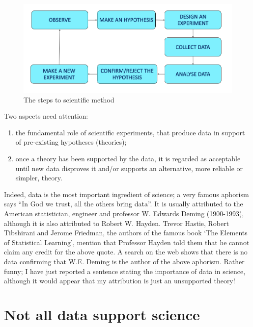 \documentclass[a4paper,12pt,oneside]{book}
\providecommand{\tightlist}{%
  \setlength{\itemsep}{0pt}\setlength{\parskip}{0pt}}
\begin{document}
\begin{figure}

{\centering \includegraphics[width=0.75\linewidth]{_images/MSAMap} 

}

\caption{The steps to scientific method}\label{fig:figName11}
\end{figure}

Two aspects need attention:

\begin{enumerate}
\def\labelenumi{\arabic{enumi}.}
\tightlist
\item
  the fundamental role of scientific experiments, that produce data in support of pre-existing hypotheses (theories);
\item
  once a theory has been supported by the data, it is regarded as acceptable until new data disproves it and/or supports an alternative, more reliable or simpler, theory.
\end{enumerate}

Indeed, data is the most important ingredient of science; a very famous aphorism says ``In God we trust, all the others bring data''. It is usually attributed to the American statistician, engineer and professor W. Edwards Deming (1900-1993), although it is also attributed to Robert W. Hayden. Trevor Hastie, Robert Tibshirani and Jerome Friedman, the authors of the famous book `The Elements of Statistical Learning', mention that Professor Hayden told them that he cannot claim any credit for the above quote. A search on the web shows that there is no data confirming that W.E. Deming is the author of the above aphorism. Rather funny; I have just reported a sentence stating the importance of data in science, although it would appear that my attribution is just an unsupported theory!

\hypertarget{not-all-data-support-science}{%
\section{Not all data support science}\label{not-all-data-support-science}}
\end{document}
